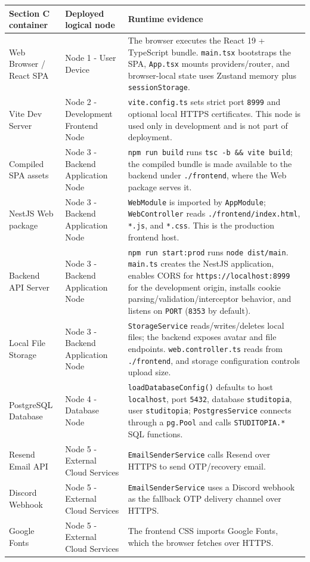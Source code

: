 \documentclass[12pt]{article}
\renewcommand{\baselinestretch}{1.5}
\begin{document}
\begingroup
\small
\renewcommand{\baselinestretch}{1.0}\selectfont
\renewcommand{\arraystretch}{1.15}
\setlength{\tabcolsep}{6pt}
\begin{longtable}{|>{\raggedright\arraybackslash}p{}|>{\raggedright\arraybackslash}p{}|>{\raggedright\arraybackslash}p{}|}
\hline
\textbf{Section C container} & \textbf{Deployed logical node} & \textbf{Runtime evidence} \\ \hline
\endhead
Web Browser / React SPA & Node 1 - User Device & The browser executes the React 19 + TypeScript bundle. \texttt{main.tsx} bootstraps the SPA, \texttt{App.tsx} mounts providers/router, and browser-local state uses Zustand memory plus \texttt{sessionStorage}. \\ \hline
Vite Dev Server & Node 2 - Development Frontend Node & \texttt{vite.config.ts} sets strict port \texttt{8999} and optional local HTTPS certificates. This node is used only in development and is not part of deployment. \\ \hline
Compiled SPA assets & Node 3 - Backend Application Node & \texttt{npm run build} runs \texttt{tsc -b \&\& vite build}; the compiled bundle is made available to the backend under \texttt{./frontend}, where the Web package serves it. \\ \hline
NestJS Web package & Node 3 - Backend Application Node & \texttt{WebModule} is imported by \texttt{AppModule}; \texttt{WebController} reads \texttt{./frontend/index.html}, \texttt{*.js}, and \texttt{*.css}. This is the production frontend host. \\ \hline
Backend API Server & Node 3 - Backend Application Node & \texttt{npm run start:prod} runs \texttt{node dist/main}. \texttt{main.ts} creates the NestJS application, enables CORS for \texttt{https://localhost:8999} for the development origin, installs cookie parsing/validation/interceptor behavior, and listens on \texttt{PORT} (\texttt{8353} by default). \\ \hline
Local File Storage & Node 3 - Backend Application Node & \texttt{StorageService} reads/writes/deletes local files; the backend exposes avatar and file endpoints. \texttt{web.controller.ts} reads from \texttt{./frontend}, and storage configuration controls upload size. \\ \hline
PostgreSQL Database & Node 4 - Database Node & \texttt{loadDatabaseConfig()} defaults to host \texttt{localhost}, port \texttt{5432}, database \texttt{studitopia}, user \texttt{studitopia}; \texttt{PostgresService} connects through a \texttt{pg.Pool} and calls \texttt{STUDITOPIA.*} SQL functions. \\ \hline
Resend Email API & Node 5 - External Cloud Services & \texttt{EmailSenderService} calls Resend over HTTPS to send OTP/recovery email. \\ \hline
Discord Webhook & Node 5 - External Cloud Services & \texttt{EmailSenderService} uses a Discord webhook as the fallback OTP delivery channel over HTTPS. \\ \hline
Google Fonts & Node 5 - External Cloud Services & The frontend CSS imports Google Fonts, which the browser fetches over HTTPS. \\ \hline
\end{longtable}
\end{document}
